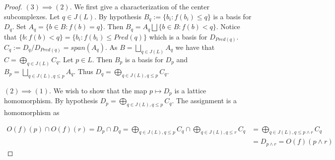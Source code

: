 \begin{proof}





 $(3)\implies (2)$.  We first give a characterization of the center subcomplexes.  Let $q\in J(L)$.  By hypothesis $B_q:= \{b_i: f(b_i)\leq q\}$ is a basis for $D_q$.  Set $A_q =  \{b\in B:f(b)=q\}$.  Then $B_q = A_q\bigsqcup \{b\in B:f(b)< q\}$.  Notice that $\{b:f(b)<q\} = \{b_i:f(b_i)\leq Pred(q)\}$ which is a basis for $D_{Pred(q)}$.    $C_q := D_q/ D_{Pred(q)} = span(A_q)$.  As $B = \bigsqcup_{q\in J(L)} A_q$ we have that $C=\bigoplus_{q\in J(L)} C_q$.  Let $p\in L$.  Then $B_p$ is a basis for $D_p$ and $B_p = \bigsqcup_{q\in J(L),q\leq p} A_q$.  Thus $D_q = \bigoplus_{q\in J(L),q\leq p} C_q$.



 


%
% 

 

 $(2)\implies (1)$.  We wish to show that the map $p\mapsto D_p$ is a lattice homomorphism.  By hypothesis $D_p = \bigoplus_{q\in J(L),q\leq p} C_q$. The assignment is a homomorphism as

\begin{align*}
O(f)(p) \cap O(f)(r) = D_p\cap D_q = \bigoplus_{q\in J(L),q\leq p} C_q \cap \bigoplus_{q\in J(L), q\leq r} C_q &= \bigoplus_{q\in J(L),q\leq p\wedge r} C_q \\&= D_{p\wedge r} = O(f)(p\wedge r)
\end{align*}


\end{proof}
